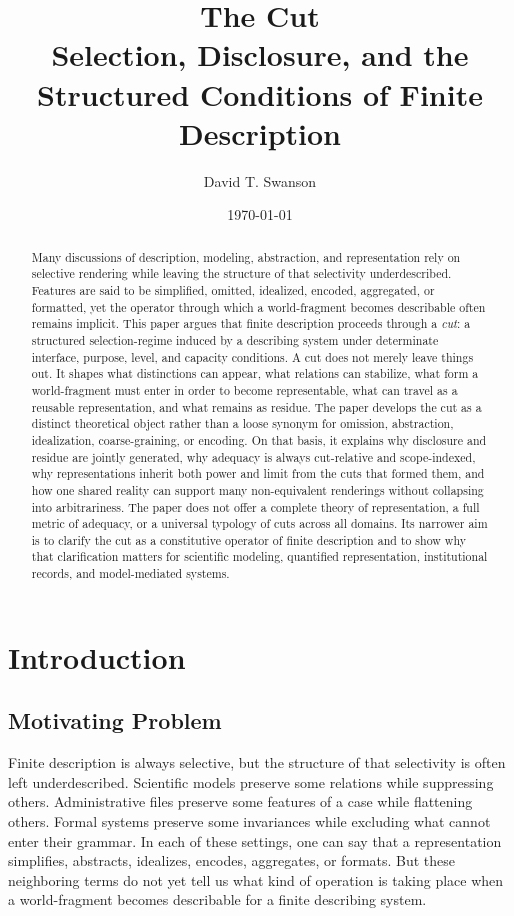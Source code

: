 \documentclass[11pt]{article}
\title{\textbf{The Cut}\\
\large Selection, Disclosure, and the Structured Conditions of Finite Description}
\author{David T. Swanson}
\date{\today}
\renewcommand{\emph}[1]{\textit{#1}}
\begin{document}
\maketitle

\begin{abstract}
Many discussions of description, modeling, abstraction, and representation rely on selective rendering while leaving the structure of that selectivity underdescribed. Features are said to be simplified, omitted, idealized, encoded, aggregated, or formatted, yet the operator through which a world-fragment becomes describable often remains implicit. This paper argues that finite description proceeds through a \emph{cut}: a structured selection-regime induced by a describing system under determinate interface, purpose, level, and capacity conditions. A cut does not merely leave things out. It shapes what distinctions can appear, what relations can stabilize, what form a world-fragment must enter in order to become representable, what can travel as a reusable representation, and what remains as residue. The paper develops the cut as a distinct theoretical object rather than a loose synonym for omission, abstraction, idealization, coarse-graining, or encoding. On that basis, it explains why disclosure and residue are jointly generated, why adequacy is always cut-relative and scope-indexed, why representations inherit both power and limit from the cuts that formed them, and how one shared reality can support many non-equivalent renderings without collapsing into arbitrariness. The paper does not offer a complete theory of representation, a full metric of adequacy, or a universal typology of cuts across all domains. Its narrower aim is to clarify the cut as a constitutive operator of finite description and to show why that clarification matters for scientific modeling, quantified representation, institutional records, and model-mediated systems.
\end{abstract}
\pagebreak
\section{Introduction}

\subsection{Motivating Problem}

Finite description is always selective, but the structure of that selectivity is often left underdescribed. Scientific models preserve some relations while suppressing others. Administrative files preserve some features of a case while flattening others. Formal systems preserve some invariances while excluding what cannot enter their grammar. In each of these settings, one can say that a representation simplifies, abstracts, idealizes, encodes, aggregates, or formats. But these neighboring terms do not yet tell us what kind of operation is taking place when a world-fragment becomes describable for a finite describing system. \cite{frigg_hartmann_models_sep,frigg_nguyen_scientific_representation_sep,bowker_star_sorting_things_out}
\end{document}
